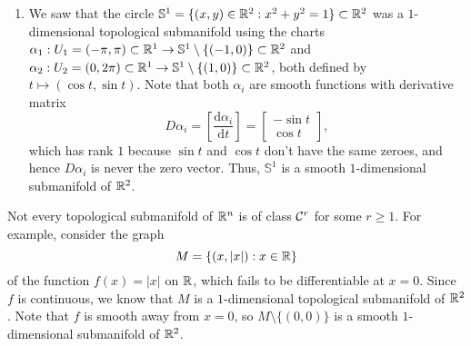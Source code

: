 \begin{enumerate}[(1)]
    \item We saw that the circle $\mathbb{S}^1 = \{(x, y) \in \mathbb{R}^2 : x^2 + y^2 = 1\} 
    \subset \mathbb{R}^2$ was a $1$-dimensional topological submanifold using
    the charts $\alpha_1 : U_1 = (-\pi, \pi) \subset \mathbb{R}^1 \to 
    \mathbb{S}^1 \setminus \{(-1, 0)\} \subset \mathbb{R}^2$ and 
    $\alpha_2 : U_2 = (0, 2\pi) \subset \mathbb{R}^1 \to \mathbb{S}^1 \setminus 
    \{(1, 0)\} \subset \mathbb{R}^2$, both defined by $t \mapsto (\cos t, \sin t)$. 
    Note that both $\alpha_i$ are smooth functions with derivative matrix 
    \[ D\alpha_i = \left[ \frac{\textrm{d}\alpha_i}{\textrm{d}t} \right] = 
    \begin{bmatrix} -\sin t \\ \cos t \end{bmatrix}, \] 
    which has rank $1$ because $\sin t$ and $\cos t$ don't have the same zeroes, 
    and hence $D\alpha_i$ is never the zero vector. Thus, $\mathbb{S}^1$ 
    is a smooth $1$-dimensional submanifold of $\mathbb{R}^2$. 
\end{enumerate}
Not every topological submanifold of $\mathbb{R}^n$ is of class ${\cal C}^r$ 
for some $r \geq 1$. For example, consider the graph 
\[ M = \{(x, |x|) : x \in \mathbb{R}\} \] 
of the function $f(x) = |x|$ on $\mathbb{R}$, which fails to be differentiable 
at $x = 0$. Since $f$ is continuous, we know that 
$M$ is a $1$-dimensional topological submanifold of $\mathbb{R}^2$. Note that $f$ is 
smooth away from $x = 0$, so $M \setminus \{(0, 0)\}$ is a smooth $1$-dimensional
submanifold of $\mathbb{R}^2$. 

